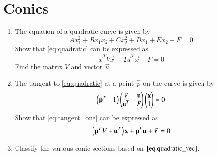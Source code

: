 \documentclass[journal,12pt,twocolumn]{IEEEtran}
\renewcommand\thesection{\arabic{section}}
\begin{document}
\section{Conics}
\begin{enumerate}[label=\thesection.\arabic*
,ref=\thesection.\theenumi]
\item The equation of a quadratic curve is given by
\begin{equation}
Ax_1^2+Bx_1x_2+Cx_2^2+Dx_1+Ex_2+F = 0
\label{eq:quadratic}
\end{equation}
%
Show that  \eqref{eq:quadratic} can be expressed as
\begin{equation}
\vec{x}^TV\vec{x}+2\vec{u}^T\vec{x}+ F = 0
\label{eq:quadratic_vec}
\end{equation}
%
Find the matrix $V$ and vector $\vec{u}$.
\item The tangent to \eqref{eq:quadratic} at a point $\vec{p}$ on the curve is given by
\begin{equation}
\begin{pmatrix}\mathbf{p}^T & 1\end{pmatrix}\begin{pmatrix}V & \mathbf{u} \\ \mathbf{u}^T & F\end{pmatrix} \begin{pmatrix}\mathbf{x} \\ 1\end{pmatrix} = 0
\label{eq:tangent_one}
\end{equation}
%
Show that \eqref{eq:tangent_one} can be expressed as
\begin{equation}
\left(\mathbf{p}^TV+\mathbf{u}^T\right)\mathbf{x} + \mathbf{p}^T\mathbf{u} +F = 0
\label{eq:tangent}
\end{equation}
\item Classify the various conic sections based on $\eqref{eq:quadratic_vec}$.
\\
\solution 
\begin{table}[!hb]
\centering

\caption{}
\label{table:conics}
\end{table}

\end{enumerate}
\end{document}
